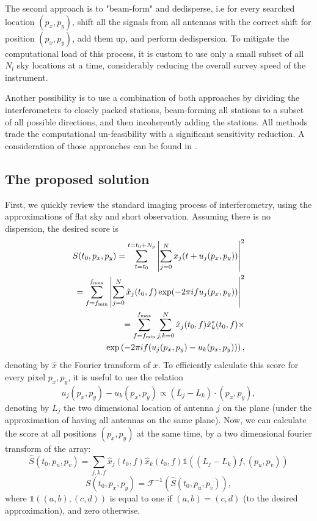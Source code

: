 \documentclass[iop]{emulateapj}
\begin{document}
The second approach is to "beam-form" and dedisperse, i.e for every searched location $(p_x,p_y)$, shift all the signals from all antennas with the correct shift for position $(p_x,p_y)$, add them up, and perform dedispersion.
To mitigate the computational load of this process, it is custom to use only a small subset of all $N_l$ sky locations at a time, considerably reducing the overall survey speed of the instrument.

Another possibility is to use a combination of both approaches by dividing the interferometers to closely packed stations, beam-forming all stations to a subset of all possible directions, and then incoherently adding the stations.
All methods trade the computational un-feasibility with a significant sensitivity reduction.
A consideration of those approaches can be found in \citep{LOFARPulsar}.
\subsection{The proposed solution}
First, we quickly review the standard imaging process of interferometry, using the approximations of flat sky and short observation. Assuming there is no dispersion, the desired score is 
\begin{align}
S(t_0,p_x,p_y) = \sum_{t = t_0}^{t = t_0 + {N_{p}}}{\left|\sum_{j=0}^{N}{x_j(t + u_j(p_x,p_y))}\right|^2} \\  \nonumber
=\sum_{f=f_{\rm min}}^{f_{\rm max}}{\left|\sum_{j=0}^{N}{\hat{x}_j(t_0,f) \exp(-2\pi ifu_j(p_x,p_y))}\right|^2}\\ \nonumber
=\sum_{f=f_{\rm min}}^{f_{\rm max}}{\sum_{j,k=0}^{N}{\hat{x}_j(t_0,f)\hat{x}_k^*(t_0,f)}}\times\\ \nonumber \exp\left(-2\pi if(u_j(p_x,p_y) - u_k(p_x,p_y))\right),
\end{align}
denoting by $\hat{x}$ the Fourier transform of $x$.
To efficiently calculate this score for every pixel $p_x,p_y$, it is useful to use the relation 
\begin{equation}
u_j(p_x,p_y) - u_k(p_x,p_y) \propto (L_j-L_k)\cdot (p_x,p_y),
\end{equation}
denoting by $L_j$ the two dimensional location of antenna $j$ on the plane (under the approximation of having all antennas on the same plane).
Now, we can calculate the score at all positions $(p_x,p_y)$ at the same time, by a two dimensional fourier transform of the array:
\begin{equation}\label{Eq:InterferometerFXScore}
\hat{S}(t_0,p_u,p_v) = \sum_{j,k,f}{\hat{x}_j(t_0,f)\hat{x}_k(t_0,f)\mathbb{1}((L_j-L_k)f,(p_u,p_v))}
\end{equation}
\begin{equation}
S(t_0,p_x,p_y) = \mathcal{F}^{-1}(\hat{S}(t_0,p_u,p_v)),
\end{equation}
where $\mathbb{1}((a,b),(c,d))$ is equal to one if $(a,b)=(c,d)$ (to the desired approximation), and zero otherwise.
\end{document}
